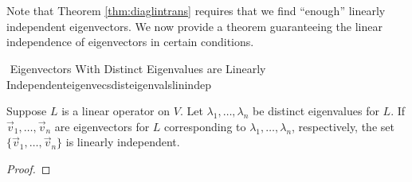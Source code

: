         \pagebreak
        \vphantom
        \\
        \\
        Note that Theorem \ref{thm:diaglintrans} requires that we find ``enough'' linearly independent eigenvectors. We now provide a theorem guaranteeing the linear independence of eigenvectors in certain conditions.
        \begin{theorem}{\Stop\,\,Eigenvectors With Distinct Eigenvalues are Linearly Independent}{eigenvecsdisteigenvalslinindep}

            Suppose \(L\) is a linear operator on \(V\). Let \(\lambda_1,\ldots,\lambda_n\) be distinct eigenvalues for \(L\). If \(\vec{v}_1,\ldots,\vec{v}_n\) are eigenvectors for \(L\) corresponding to \(\lambda_1,\ldots,\lambda_n\), respectively, the set \(\{\vec{v}_1,\ldots,\vec{v}_n\}\) is linearly independent.
            \begin{proof}
                

\end{proof}
\end{theorem}
